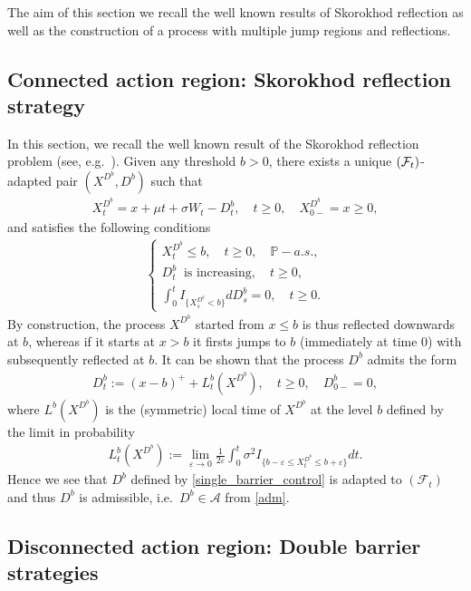 \documentclass[11pt]{article} %
\def\Pr{\mathbb{P}}
\numberwithin{komcounter}{section}
\renewcommand{\epsilon}{\varepsilon}
\numberwithin{equation}{section}
\numberwithin{theorem}{section}
\begin{document}
The aim of this section we recall the well known results of Skorokhod reflection as well as the construction of a process with multiple jump regions and reflections. 

\subsection{Connected action region: Skorokhod reflection strategy}
\label{scorohod_sec}

In this section, we recall the well known result of the Skorokhod reflection problem (see, e.g.~\cite{pilipenko2014introduction, Chitashvili01121981}). 
Given any threshold $b>0$, there exists a unique $\left({\cal F}_t\right)$-adapted pair $(X^{D^b},D^b)$ such that
\begin{align}\label{reflected_eq}
X^{D^b}_t = x + \mu t + \sigma W_t -D^b_t, \quad t\geq 0, \quad X^{D^b}_{0-}=x\geq 0,
\end{align}
and satisfies the following conditions
\begin{align} \label{SRP}
\begin{cases}
X^{D^b}_t\leq b, \quad t\geq 0, \quad \Pr-a.s., \\
D^b_t \;\;\text{is increasing} , \quad t\geq 0, \\
\int_0^t I_{\{X^{D^b}_s<b\}} dD_s^b = 0, \quad t\geq 0.
\end{cases}
\end{align}
By construction, the process $X^{D^b}$ started from $x \leq b$ is thus reflected downwards at $b$, whereas if it starts at $x>b$ it firsts jumps to $b$ (immediately at time $0$) with subsequently reflected at $b$. It can be shown that the process $D^b$ admits the form
\begin{align} \label{single_barrier_control}
D^b_t := (x-b)^+ + L^b_t(X^{D^b}), \quad t\geq 0, \quad D^b_{0-}=0,
\end{align} where $L^b(X^{D^b})$ is the (symmetric) local time of $X^{D^b}$ at the level $b$ defined by the
limit in probability
\begin{align*}
 L^b_t(X^{D^b}):= \lim_{\epsilon \to 0}  \frac{1}{2\epsilon}\int_0^t \sigma^2I_{\{b-\epsilon\leq X^{D^b}_t\leq b+\epsilon\}}dt.
\end{align*}
Hence we see that $D^b$ defined by \eqref{single_barrier_control} is adapted to $(\mathcal{F}_t)$ and thus $D^b$ is admissible, i.e.~$D^b\in \mathcal{A}$ from \eqref{adm}.

\subsection{Disconnected action region: Double barrier strategies}
\label{scorohod_sec_jump}
\end{document}
